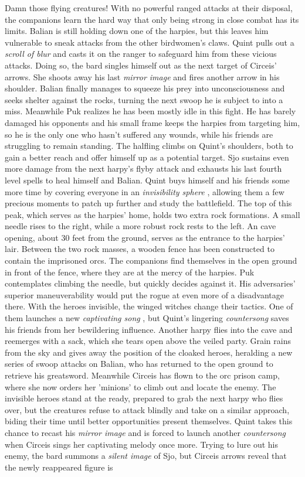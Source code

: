 Damn those flying creatures! With no powerful ranged attacks at their disposal, the companions learn the hard way that only being strong in close combat has its limits. Balian is still holding down one of the harpies, but this leaves him vulnerable to sneak attacks from the other birdwomen's claws. Quint pulls out a {\itshape scroll of blur} and casts it on the ranger to safeguard him from these vicious attacks. Doing so, the bard singles himself out as the next target of Circeis' arrows. She shoots away his last  {\itshape mirror image} and fires another arrow in his shoulder. Balian finally manages to squeeze his prey into unconsciousness and seeks shelter against the rocks, turning the next swoop he is subject to into a miss. Meanwhile Puk realizes he has been mostly idle in this fight. He has barely damaged his opponents and his small frame keeps the harpies from targeting him, so he is the only one who hasn't suffered any wounds, while his friends are struggling to remain standing. The halfling climbs on Quint's shoulders, both to gain a better reach and offer himself up as a potential target. Sjo sustains even more damage from the next harpy's flyby attack and exhausts his last fourth level spells to heal himself and Balian. Quint buys himself and his friends some more time by covering everyone in an  {\itshape invisibility sphere} , allowing them a few precious moments to patch up further and study the battlefield. The top of this peak, which serves as the harpies' home, holds two extra rock formations. A small needle rises to the right, while a more robust rock rests to the left. An cave opening, about 30 feet from the ground, serves as the entrance to the harpies' lair. Between the two rock masses, a wooden fence has been constructed to contain the imprisoned orcs. The companions find themselves in the open ground in front of the fence, where they are at the mercy of the harpies. Puk contemplates climbing the needle, but quickly decides against it. His adversaries' superior maneuverability would put the rogue at even more of a disadvantage there. With the heroes invisible, the winged witches change their tactics. One of them launches a new {\itshape captivating song} , but Quint's lingering  {\itshape countersong} saves his friends from her bewildering influence. Another harpy flies into the cave and reemerges with a sack, which she tears open above the veiled party. Grain rains from the sky and gives away the position of the cloaked heroes, heralding a new series of swoop attacks on Balian, who has returned to the open ground to retrieve his greatsword. Meanwhile Circeis has flown to the orc prison camp, where she now orders her 'minions' to climb out and locate the enemy. The invisible heroes stand at the ready, prepared to grab the next harpy who flies over, but the creatures refuse to attack blindly and take on a similar approach, biding their time until better opportunities present themselves. Quint takes this chance to recast his  {\itshape mirror image} and is forced to launch another  {\itshape countersong} when Circeis sings her captivating melody once more. Trying to lure out his enemy, the bard summons a  {\itshape silent image} of Sjo, but Circeis arrows reveal that the newly reappeared figure is 